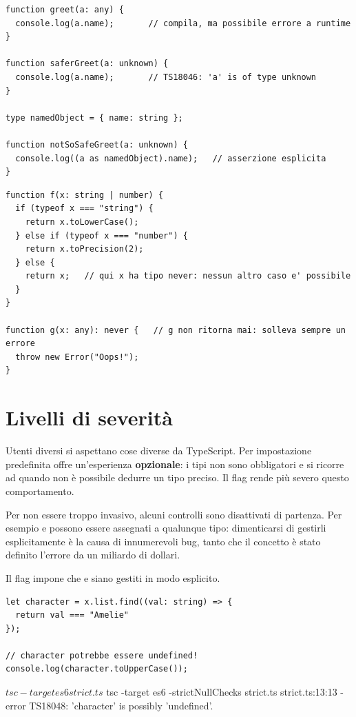 \begin{lstlisting}[style=ts, name=unknown.ts]
function greet(a: any) {
  console.log(a.name);       // compila, ma possibile errore a runtime
}

function saferGreet(a: unknown) {
  console.log(a.name);       // TS18046: 'a' is of type unknown
}

type namedObject = { name: string };

function notSoSafeGreet(a: unknown) {
  console.log((a as namedObject).name);   // asserzione esplicita
}
\end{lstlisting}

\begin{lstlisting}[style=ts, name=never.ts]
function f(x: string | number) {
  if (typeof x === "string") {
    return x.toLowerCase();
  } else if (typeof x === "number") {
    return x.toPrecision(2);
  } else {
    return x;   // qui x ha tipo never: nessun altro caso e' possibile
  }
}

function g(x: any): never {   // g non ritorna mai: solleva sempre un errore
  throw new Error("Oops!");
}
\end{lstlisting}

\section{Livelli di severità}

Utenti diversi si aspettano cose diverse da TypeScript. Per impostazione
predefinita offre un'esperienza \textbf{opzionale}: i tipi non sono obbligatori
e si ricorre ad  quando non è possibile dedurre un tipo preciso. Il
flag  rende più severo questo comportamento.

Per non essere troppo invasivo, alcuni controlli sono disattivati di
partenza. Per esempio  e  possono essere assegnati a
qualunque tipo: dimenticarsi di gestirli esplicitamente è la causa di
innumerevoli bug, tanto che il concetto è stato definito \guillemotleft l'errore da un
miliardo di dollari\guillemotright.

Il flag  impone che  e  siano
gestiti in modo esplicito.

\begin{affianco}[0.55][c]
\begin{lstlisting}[style=ts, name=strict.ts]
let character = x.list.find((val: string) => {
  return val === "Amelie"
});

// character potrebbe essere undefined!
console.log(character.toUpperCase());
\end{lstlisting}
\risultato
\begin{console}[Terminale]
$ tsc -target es6 strict.ts
$ tsc -target es6 -strictNullChecks strict.ts
strict.ts:13:13 - error TS18048:
  'character' is possibly 'undefined'.
\end{console}
\end{affianco}

